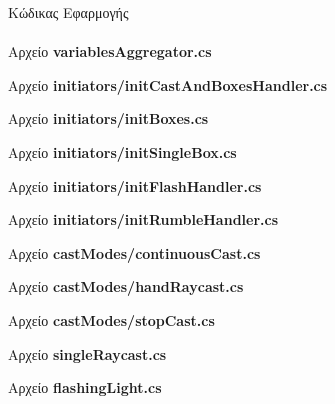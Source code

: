 
{\LARGE Κώδικας Εφαρμογής}
\\
\\

\lstset{style=sharpc}
{\large Αρχείο \textbf{variablesAggregator.cs}}\label{lst:variablesAggregator}


{\large Αρχείο \textbf{initiators/initCastAndBoxesHandler.cs}}\label{lst:initCastAndBoxesHandler}


{\large Αρχείο \textbf{initiators/initBoxes.cs}}\label{lst:initBoxes}


{\large Αρχείο \textbf{initiators/initSingleBox.cs}}\label{lst:initSingleBox}


{\large Αρχείο \textbf{initiators/initFlashHandler.cs}}\label{lst:initFlashHandler}


{\large Αρχείο \textbf{initiators/initRumbleHandler.cs}}\label{lst:initRumbleHandler}


{\large Αρχείο \textbf{castModes/continuousCast.cs}}\label{lst:continuousCast}


{\large Αρχείο \textbf{castModes/handRaycast.cs}}\label{lst:handRaycast}


{\large Αρχείο \textbf{castModes/stopCast.cs}}\label{lst:stopCast}


{\large Αρχείο \textbf{singleRaycast.cs}}\label{lst:singleRaycast}


{\large Αρχείο \textbf{flashingLight.cs}}\label{lst:flashingLight}
